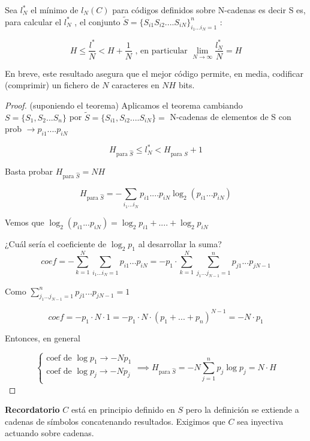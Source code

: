 	\begin{corol}
		\label{corolario minima longitud}
		Sea $l^{*}_N$ el mínimo de $l_N(C)$ para códigos definidos sobre N-cadenas es decir S es, para calcular el $l^{*}_N$ , el conjunto $\widetilde{S} = \{ S_{i1}  S_{i2}  .... S_{iN}\}^n_{i_1...i_N = 1}$  :

		$$ H \leq \frac{l^*}{N} < H + \frac{1}{N} \text{ , en particular  } \lim_{N \rightarrow \infty} \frac{l^*_N}{N} = H$$

		En breve, este resultado asegura que el mejor código permite, en media, codificar (comprimir) un fichero de $N$ caracteres en $NH$ bits.

	\end{corol}
\begin{proof}
	(suponiendo el teorema)
		Aplicamos el teorema cambiando $S = \{ S_1,S_2...S_n \}$ por $\widetilde{S} = \{S_{i1}, S_{i2} .... S_{iN} \} =$ 
		{N-cadenas de elementos de S} con prob $\rightarrow p_{i1}.... p_{iN}$
		
	$$H _{\text{para } \widehat{S}} \leq l^{*}_N < H _{\text{para } \widehat{S}} +1 $$
	
	Basta probar $H _{\text{para } \widehat{S}} = NH$
		
	$$H _{\text{para } \widehat{S}} = - \sum_{i_1...i_N} p_{i1}....p_{iN} \log_2 (p_{i1}...p_{iN})$$
		
	Vemos que $\log_2 (p_{i1}...p_{iN}) = \log_2 p_{i1} + .... + \log_2 p_{iN}$
	
	¿Cuál sería el coeficiente de $\log_2 p_1$ al desarrollar la suma?
	$$coef = - \sum_{k = 1}^{N}\sum_{i_1...i_N = 1} p_{i1} ... p_{iN} = - p_1 \cdot \sum_{k=1}^{N} \sum_{j_1 ... j_{N-1} = 1}^{n} p_{j1} ... p_{jN-1}$$
	
	Como $\sum_{j_1 ... j_{N-1} = 1}^{n} p_{j1} ... p_{jN-1} = 1$
	
	$$ coef = - p_1 \cdot N \cdot 1 = - p_1 \cdot N \cdot ( p_1 + ... + p_n)^{N-1} = -N\cdot p_1$$
	
	Entonces, en general
	
	$$\begin{cases}
	\text{coef de } \log p_1 \rightarrow -Np_1\\
	\text{coef de } \log p_j \rightarrow -Np_j\\
	\end{cases}  \implies H _{\text{para } \widehat{S}} = -N \sum_{j=1}^{n} p_j \log p_j = N\cdot H$$
	
\end{proof}

	\textbf{Recordatorio} $C$ está en principio definido en $S$ pero la definición se extiende a cadenas de símbolos concatenando resultados. Exigimos que $C$ sea inyectiva actuando sobre cadenas.

